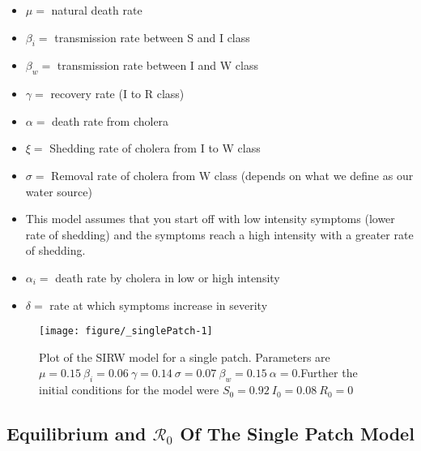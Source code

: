 \documentclass[12pt]{article}\usepackage[]{graphicx}\usepackage[]{color}
\makeatletter
\def\maxwidth{ %
  \ifdim\Gin@nat@width>\linewidth
    \linewidth
  \else
    \Gin@nat@width
  \fi
}
\newenvironment{knitrout}{}{} %
\makeatother
\begin{document}
	\begin{itemize}
		\item$\mu=$ natural death rate
		\item$\beta_i=$ transmission rate between S and I class
		\item$\beta_w=$ transmission rate between I and W class
		\item$\gamma=$ recovery rate (I to R class)
		\item$\alpha=$ death rate from cholera
		\item$\xi=$ Shedding rate of cholera from I to W class
		\item$\sigma=$	Removal rate of cholera from W class (depends on what we define as our water source)
	\end{itemize}

\begin{itemize}
	\item This model assumes that you start off with low intensity symptoms (lower rate of shedding) and the symptoms reach a high intensity with a greater rate of shedding.
	\item$\alpha_i=$ death rate by cholera in low or high intensity
	\item$\delta =$ rate at which symptoms increase in severity
\end{itemize}


\begin{knitrout}
\color{fgcolor}\begin{figure}
\texttt{[image: figure/\_singlePatch-1]} \caption{\label{fig:singlepatch} Plot of the SIRW model for a single patch. Parameters are $\mu=0.15\ \beta_i=0.06\ \gamma=0.14\ \sigma=0.07\ \beta_w=0.15\ \alpha=0$.Further the initial conditions for the model were $S_0=0.92\ I_0=0.08\ R_0=0$}\label{fig:<singlePatch}
\end{figure}


\end{knitrout}
\FloatBarrier
\subsection{Equilibrium and {$\mathcal R_0$} Of The Single Patch Model}
\end{document}
